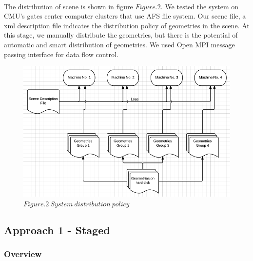\documentclass[a4paper, oneside, 10pt]{article}
\begin{document}
\paragraph{}The distribution of scene is shown in figure $Figure. 2$. We tested the system on CMU’s gates center computer clusters that use AFS file system. Our scene file, a xml description file indicates the distribution policy of geometries in the scene. At this stage, we manually distribute the geometries, but there is the potential of automatic and smart distribution of geometries. We used Open MPI message passing interface for data flow control.
\begin{figure}[h]
\includegraphics[width=\textwidth] {img2}
$Figure. 2\ System\ distribution\ policy$
\end{figure}

\subsection{Approach 1 - Staged}
\subsubsection{Overview}
\end{document}

